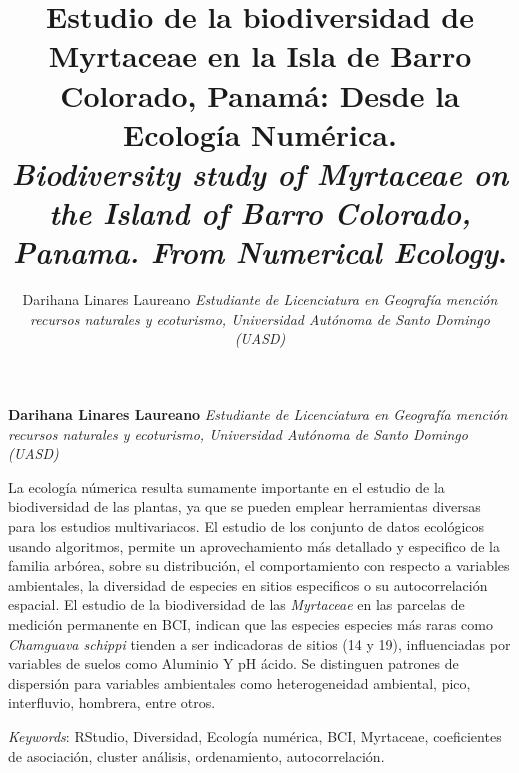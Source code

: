 \documentclass[11pt,]{article}
\title{Estudio de la biodiversidad de Myrtaceae en la Isla de Barro Colorado,
Panamá: Desde la Ecología Numérica.\\
\emph{Biodiversity study of Myrtaceae on the Island of Barro Colorado,
Panama. From Numerical Ecology}.  }
\author{\Large Darihana Linares Laureano\vspace{0.05in} \newline\normalsize\emph{Estudiante de Licenciatura en Geografía mención recursos naturales y
ecoturismo, Universidad Autónoma de Santo Domingo (UASD)}  }
\date{}
\newcommand*{\authorfont}{\fontfamily{phv}\selectfont}
\renewenvironment{abstract}
 {{%
    \setlength{\leftmargin}{0mm}
    \setlength{\rightmargin}{\leftmargin}%
  }%
  \relax}
 {\endlist}
\begin{document}
	
%

{%
\setlength{\parindent}{0pt}
\thispagestyle{plain}
{\fontsize{18}{20}\selectfont\raggedright 
\maketitle  %

}

{
   \vskip 13.5pt\relax \normalsize\fontsize{11}{12} 
\textbf{\authorfont Darihana Linares Laureano} \hskip 15pt \emph{\small Estudiante de Licenciatura en Geografía mención recursos naturales y
ecoturismo, Universidad Autónoma de Santo Domingo (UASD)}   

}

}








\begin{abstract}

    \hbox{\vrule height .2pt width 39.14pc}

    \vskip 8.5pt %

\noindent La ecología númerica resulta sumamente importante en el estudio de la
biodiversidad de las plantas, ya que se pueden emplear herramientas
diversas para los estudios multivariacos. El estudio de los conjunto de
datos ecológicos usando algoritmos, permite un aprovechamiento más
detallado y especifico de la familia arbórea, sobre su distribución, el
comportamiento con respecto a variables ambientales, la diversidad de
especies en sitios especificos o su autocorrelación espacial. El estudio
de la biodiversidad de las \emph{Myrtaceae} en las parcelas de medición
permanente en BCI, indican que las especies especies más raras como
\emph{Chamguava schippi} tienden a ser indicadoras de sitios (14 y 19),
influenciadas por variables de suelos como Aluminio Y pH ácido. Se
distinguen patrones de dispersión para variables ambientales como
heterogeneidad ambiental, pico, interfluvio, hombrera, entre otros.


\vskip 8.5pt \noindent \emph{Keywords}: RStudio, Diversidad, Ecología numérica, BCI, Myrtaceae, coeficientes de
asociación, cluster análisis, ordenamiento, autocorrelación. \par

    \hbox{\vrule height .2pt width 39.14pc}



\end{abstract}
\end{document}
